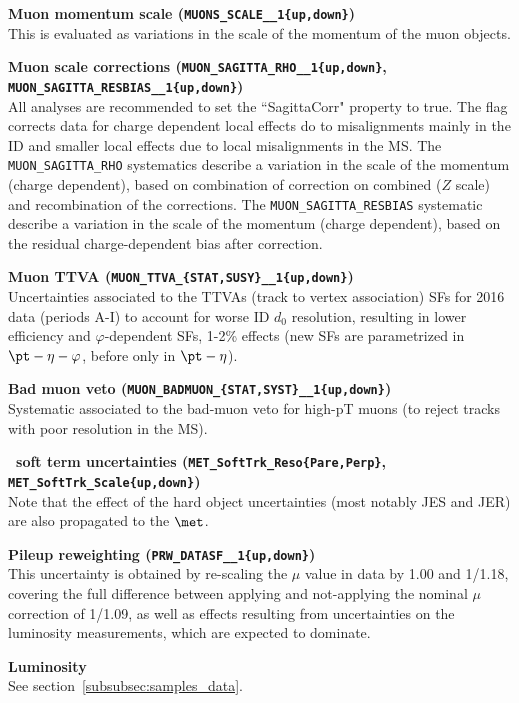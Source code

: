 \textbf{Muon momentum scale ({\tt{MUONS\_SCALE\_\_1\{up,down\}}})} \\  %
This is evaluated as variations in the scale of the momentum of the muon objects.

\textbf{Muon scale corrections ({\tt{MUON\_SAGITTA\_RHO\_\_1\{up,down\}}}, {\tt{MUON\_SAGITTA\_RESBIAS\_\_1\{up,down\}}})} \\  %
All analyses are recommended to set the ``SagittaCorr" property to true. The flag corrects data for charge dependent local effects do to misalignments mainly in the ID and smaller local effects due to local misalignments in the MS. The {\tt{MUON\_SAGITTA\_RHO}} systematics describe a variation in the scale of the momentum (charge dependent), based on combination of correction on combined ($Z$ scale) and recombination of the corrections. The {\tt{MUON\_SAGITTA\_RESBIAS}} systematic describe a variation in the scale of the momentum (charge dependent), based on the residual charge-dependent bias after correction.

\textbf{Muon TTVA ({\tt{MUON\_TTVA\_\{STAT,SUSY\}\_\_1\{up,down\}}})}\\ %
Uncertainties associated to the TTVAs (track to vertex association) SFs for 2016 data (periods A-I) to account for worse ID $d_0$ resolution, resulting in lower efficiency and $\varphi$-dependent SFs, 1-2\% effects (new SFs are parametrized in $\pt-\eta-\varphi$, before only in $\pt-\eta$).

\textbf{Bad muon veto ({\tt{MUON\_BADMUON\_\{STAT,SYST\}\_\_1\{up,down\}}})}\\ %
Systematic associated to the bad-muon veto for high-pT muons (to reject tracks with poor resolution in the MS).

\textbf{\met\ soft term uncertainties  ({\tt{MET\_SoftTrk\_Reso\{Pare,Perp\}}}, {\tt{MET\_SoftTrk\_Scale\{up,down\}}})}\\  %
Note that the effect of the hard object uncertainties (most notably JES and JER) are also propagated to the $\met$.

\textbf{Pileup reweighting ({\tt{PRW\_DATASF\_\_1\{up,down\}}})}\\  %
This uncertainty is obtained by re-scaling the $\mu$ value in data by 1.00 and 1/1.18, 
covering the full difference between applying and not-applying the nominal $\mu$ correction of 1/1.09, 
as well as effects resulting from uncertainties on the luminosity measurements, which are expected to dominate.

\textbf{Luminosity}\\  %
See section~\ref{subsubsec:samples_data}.

